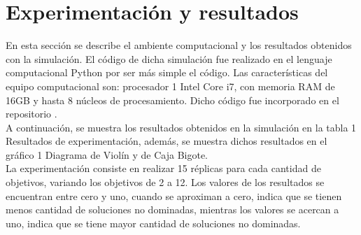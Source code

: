 \documentclass{article}
\begin{document}
	\section{Experimentación y resultados}
	En esta sección se describe el ambiente computacional y los resultados obtenidos con la simulación. El código de dicha simulación fue realizado en el lenguaje computacional Python por ser más simple el código. Las características del equipo computacional son:  procesador 1 Intel Core i7, con memoria RAM de 16GB y hasta 8 núcleos de procesamiento. Dicho código fue incorporado en el repositorio \cite{p_a}.\\ 
	A continuación, se muestra los resultados obtenidos en la simulación en la tabla 1 Resultados de experimentación, además, se muestra dichos resultados en el gráfico 1 Diagrama de Violín y de Caja Bigote.\\  
	La experimentación consiste en realizar 15 réplicas para cada cantidad de objetivos, variando los objetivos de 2 a 12.  Los valores de los resultados se encuentran entre cero y uno, cuando se aproximan a cero, indica que se tienen menos cantidad de soluciones no dominadas, mientras los valores se acercan a uno, indica que se tiene mayor cantidad de soluciones no dominadas.\\
	\newpage
\end{document}
